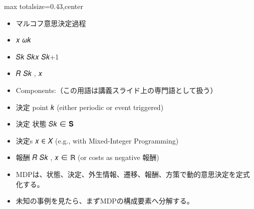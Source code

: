 \clearpage
{}
\begin{minipage}[t]{0.405\textwidth}
\begin{adjustbox}{max totalsize={\textwidth}{0.43\textheight},center}
\begin{minipage}{\textwidth}\scriptsize
{}\begin{itemize}
\item マルコフ意思決定過程
\item 𝑥 𝜔𝑘
\item 𝑆𝑘 𝑆𝑘𝑥 𝑆𝑘+1
\item 𝑅 𝑆𝑘 , 𝑥
\item Components:（この用語は講義スライド上の専門語として扱う）
\item 決定 point 𝑘 (either periodic or event triggered)
\item 決定 状態 𝑆𝑘 ∈ 𝐒
\item 決定s 𝑥 ∈ 𝑋 (e.g., with Mixed-Integer Programming)
\item 報酬 𝑅 𝑆𝑘 , 𝑥 ∈ ℝ (or costs as negative 報酬)
\end{itemize}\begin{itemize}
\item MDPは、状態、決定、外生情報、遷移、報酬、方策で動的意思決定を定式化する。
\item 未知の事例を見たら、まずMDPの構成要素へ分解する。
\end{itemize}
\end{minipage}
\end{adjustbox}
\end{minipage}\hfill
